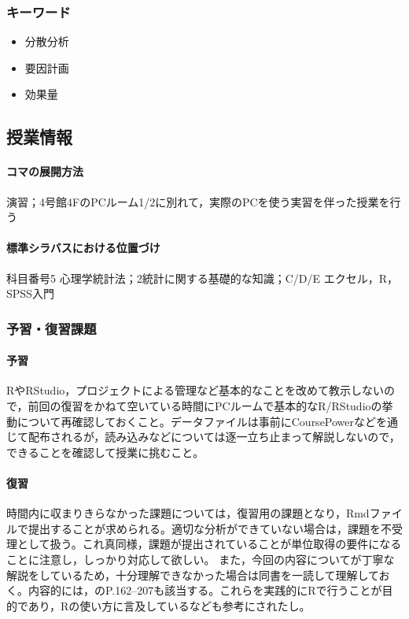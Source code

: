 \subsubsection{キーワード}
\begin{itemize}
\item 分散分析
\item 要因計画
\item 効果量
\end{itemize}
\subsection{授業情報}
\paragraph{コマの展開方法}
演習；4号館4FのPCルーム1/2に別れて，実際のPCを使う実習を伴った授業を行う
\paragraph{標準シラバスにおける位置づけ}
科目番号5 心理学統計法；2統計に関する基礎的な知識；C/D/E エクセル，R，SPSS入門
\subsubsection{予習・復習課題}
\paragraph{予習}
RやRStudio，プロジェクトによる管理など基本的なことを改めて教示しないので，前回の復習をかねて空いている時間にPCルームで基本的なR/RStudioの挙動について再確認しておくこと。データファイルは事前にCoursePowerなどを通じて配布されるが，読み込みなどについては逐一立ち止まって解説しないので，できることを確認して授業に挑むこと。
\paragraph{復習}
時間内に収まりきらなかった課題については，復習用の課題となり，Rmdファイルで提出することが求められる。適切な分析ができていない場合は，課題を不受理として扱う。これ真同様，課題が提出されていることが単位取得の要件になることに注意し，しっかり対応して欲しい。
また，今回の内容について\citet{橋本201607}が丁寧な解説をしているため，十分理解できなかった場合は同書を一読して理解しておく。内容的には，\citet{Yamada2004}のP.162--207も該当する。これらを実践的にRで行うことが目的であり，Rの使い方に言及している\citet{kosugi2019}なども参考にされたし。